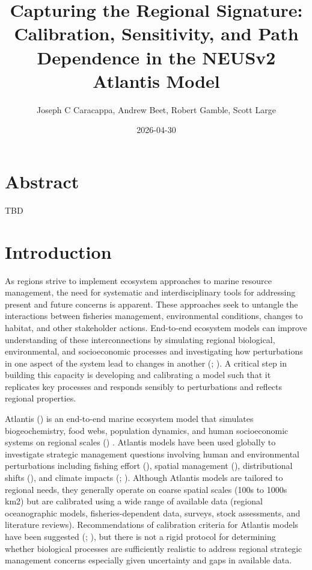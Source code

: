 \documentclass[
]{article}
\title{Capturing the Regional Signature: Calibration, Sensitivity, and Path Dependence in the NEUSv2 Atlantis Model}
\author{Joseph C Caracappa, Andrew Beet, Robert Gamble, Scott Large}
\date{2026-04-30}
\begin{document}
\maketitle

\section{Abstract}\label{abstract}

TBD

\section{Introduction}\label{introduction}

As regions strive to implement ecosystem approaches to marine resource management, the need for systematic and interdisciplinary tools for addressing present and future concerns is apparent. These approaches seek to untangle the interactions between fisheries management, environmental conditions, changes to habitat, and other stakeholder actions. End-to-end ecosystem models can improve understanding of these interconnections by simulating regional biological, environmental, and socioeconomic processes and investigating how perturbations in one aspect of the system lead to changes in another (; ). A critical step in building this capacity is developing and calibrating a model such that it replicates key processes and responds sensibly to perturbations and reflects regional properties.

Atlantis () is an end-to-end marine ecosystem model that simulates biogeochemistry, food webs, population dynamics, and human socioeconomic systems on regional scales () . Atlantis models have been used globally to investigate strategic management questions involving human and environmental perturbations including fishing effort (), spatial management (), distributional shifts (), and climate impacts (; ). Although Atlantis models are tailored to regional needs, they generally operate on coarse spatial scales (100s to 1000s km2) but are calibrated using a wide range of available data (regional oceanographic models, fisheries-dependent data, surveys, stock assessments, and literature reviews). Recommendations of calibration criteria for Atlantis models have been suggested (; ), but there is not a rigid protocol for determining whether biological processes are sufficiently realistic to address regional strategic management concerns especially given uncertainty and gaps in available data.
\end{document}
